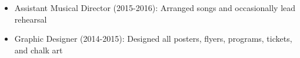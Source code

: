 \documentclass{zres}
\begin{document}
\begin{resume}
\begin{itemize}[leftmargin=10pt]
  \item Assistant Musical Director (2015-2016): Arranged songs and occasionally lead rehearsal
  \item Graphic Designer (2014-2015): Designed all posters, flyers, programs, tickets, and chalk art
\end{itemize}

\end{resume}
\end{document}
